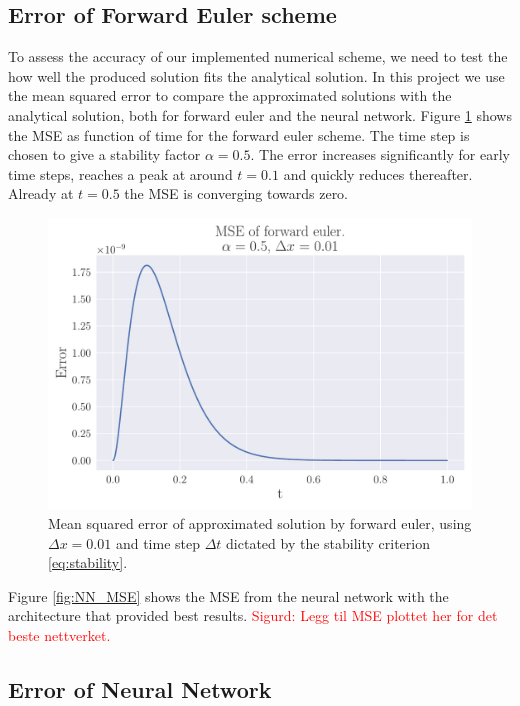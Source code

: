 \documentclass[12pt]{extarticle}
\begin{document}
\clearpage
\subsection{Error of Forward Euler scheme}

To assess the accuracy of our implemented numerical scheme, we need to test the how well the produced solution fits the analytical solution. In this project we use the mean squared error to compare the approximated solutions with the analytical solution, both for forward euler and the neural network. Figure \ref{fig:FE_MSE} shows the MSE as function of time for the forward euler scheme. The time step is chosen to give a stability factor $\alpha=0.5$. The error increases significantly for early time steps, reaches a peak at around $t=0.1$ and quickly reduces thereafter. Already at $t=0.5$ the MSE is converging towards zero.

\begin{figure}[h]
	\centering
	\includegraphics[scale=0.5]{../output/plots/MSE_FE_dx_001.pdf}
	\caption{Mean squared error of approximated solution by forward euler, using $\Delta x=0.01$ and time step $\Delta t$ dictated by the stability criterion \eqref{eq:stability}.}
	\label{fig:FE_MSE}
\end{figure}

Figure \ref{fig:NN_MSE} shows the MSE from the neural network with the architecture that provided best results. \textcolor{red}{Sigurd: Legg til MSE plottet her for det beste nettverket.}





\subsection{Error of Neural Network}
\end{document}
